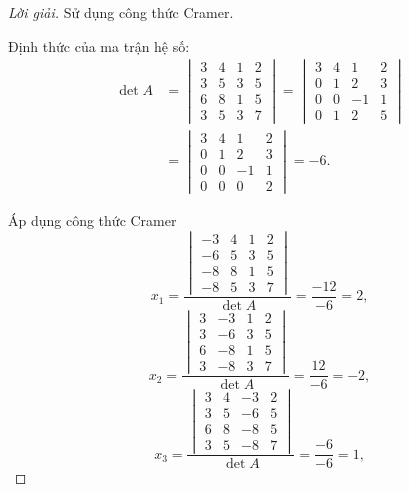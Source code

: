 \documentclass[class=nhvh-linear-algebra,crop=false]{standalone}
\begin{document}
\begin{proof}[Lời giải]
	\par Sử dụng công thức Cramer.
	\par Định thức của ma trận hệ số:
	\begingroup{}
	\allowdisplaybreaks{}
	\begin{align*}
		\det A & =
		\begin{vmatrix}
			3 & 4 & 1 & 2 \\
			3 & 5 & 3 & 5 \\
			6 & 8 & 1 & 5 \\
			3 & 5 & 3 & 7
		\end{vmatrix}
		=
		\begin{vmatrix}
			3 & 4 & 1  & 2 \\
			0 & 1 & 2  & 3 \\
			0 & 0 & -1 & 1 \\
			0 & 1 & 2  & 5
		\end{vmatrix} \\
		       & =
		\begin{vmatrix}
			3 & 4 & 1  & 2 \\
			0 & 1 & 2  & 3 \\
			0 & 0 & -1 & 1 \\
			0 & 0 & 0  & 2
		\end{vmatrix}
		= -6.
	\end{align*}
	\endgroup{}
	\par Áp dụng công thức Cramer
	\[
		x_{1} = \dfrac{
			\begin{vmatrix}
				-3 & 4 & 1 & 2 \\
				-6 & 5 & 3 & 5 \\
				-8 & 8 & 1 & 5 \\
				-8 & 5 & 3 & 7
			\end{vmatrix}
		}{\det A} = \dfrac{-12}{-6} = 2,
	\]
	\[
		x_{2} = \dfrac{
			\begin{vmatrix}
				3 & -3 & 1 & 2 \\
				3 & -6 & 3 & 5 \\
				6 & -8 & 1 & 5 \\
				3 & -8 & 3 & 7
			\end{vmatrix}
		}{\det A} = \dfrac{12}{-6} = -2,
	\]
	\[
		x_{3} = \dfrac{
			\begin{vmatrix}
				3 & 4 & -3 & 2 \\
				3 & 5 & -6 & 5 \\
				6 & 8 & -8 & 5 \\
				3 & 5 & -8 & 7
			\end{vmatrix}
		}{\det A} = \dfrac{-6}{-6} = 1,
\]
\end{proof}
\end{document}
